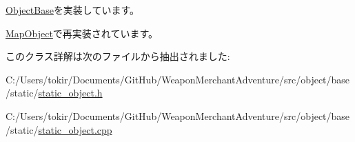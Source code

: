 \mbox{\hyperlink{class_object_base_a8b5b72b363a419767efde0b0e692ea95}{Object\+Base}}を実装しています。



\mbox{\hyperlink{class_map_object_ab6b8849f15175417eca94b2703945e4b}{Map\+Object}}で再実装されています。



このクラス詳解は次のファイルから抽出されました\+:\begin{DoxyCompactItemize}
\item 
C\+:/\+Users/tokir/\+Documents/\+Git\+Hub/\+Weapon\+Merchant\+Adventure/src/object/base/static/\mbox{\hyperlink{static__object_8h}{static\+\_\+object.\+h}}\item 
C\+:/\+Users/tokir/\+Documents/\+Git\+Hub/\+Weapon\+Merchant\+Adventure/src/object/base/static/\mbox{\hyperlink{static__object_8cpp}{static\+\_\+object.\+cpp}}\end{DoxyCompactItemize}
